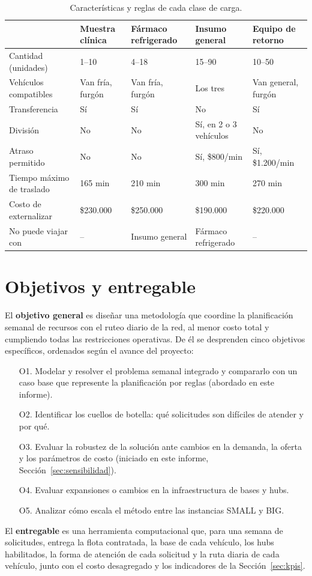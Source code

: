 \begin{table}[htbp]
\centering
\caption{Características y reglas de cada clase de carga.}\label{tab:clases}
\small
\begin{tabularx}{\textwidth}{lYYYY}
\toprule
 & Muestra clínica & Fármaco refrigerado & Insumo general & Equipo de retorno \\
\midrule
Cantidad (unidades) & 1--10 & 4--18 & 15--90 & 10--50 \\
Vehículos compatibles & Van fría, furgón & Van fría, furgón & Los tres & Van general, furgón \\
Transferencia & Sí & Sí & No & Sí \\
División & No & No & Sí, en 2 o 3 vehículos & No \\
Atraso permitido & No & No & Sí, \$800/min & Sí, \$1.200/min \\
Tiempo máximo de traslado & 165 min & 210 min & 300 min & 270 min \\
Costo de externalizar & \$230.000 & \$250.000 & \$190.000 & \$220.000 \\
No puede viajar con & -- & Insumo general & Fármaco refrigerado & -- \\
\bottomrule
\end{tabularx}
\end{table}

\section{Objetivos y entregable}\label{sec:objetivos}

El \textbf{objetivo general} es diseñar una metodología que coordine la planificación semanal de recursos con el ruteo diario de la red, al menor costo total y cumpliendo todas las restricciones operativas. De él se desprenden cinco objetivos específicos, ordenados según el avance del proyecto:
\begin{enumerate}\itemsep0pt
\item[O1.] Modelar y resolver el problema semanal integrado y compararlo con un caso base que represente la planificación por reglas (abordado en este informe).
\item[O2.] Identificar los cuellos de botella: qué solicitudes son difíciles de atender y por qué.
\item[O3.] Evaluar la robustez de la solución ante cambios en la demanda, la oferta y los parámetros de costo (iniciado en este informe, Sección~\ref{sec:sensibilidad}).
\item[O4.] Evaluar expansiones o cambios en la infraestructura de bases y hubs.
\item[O5.] Analizar cómo escala el método entre las instancias SMALL y BIG.
\end{enumerate}
El \textbf{entregable} es una herramienta computacional que, para una semana de solicitudes, entrega la flota contratada, la base de cada vehículo, los hubs habilitados, la forma de atención de cada solicitud y la ruta diaria de cada vehículo, junto con el costo desagregado y los indicadores de la Sección~\ref{sec:kpis}.

